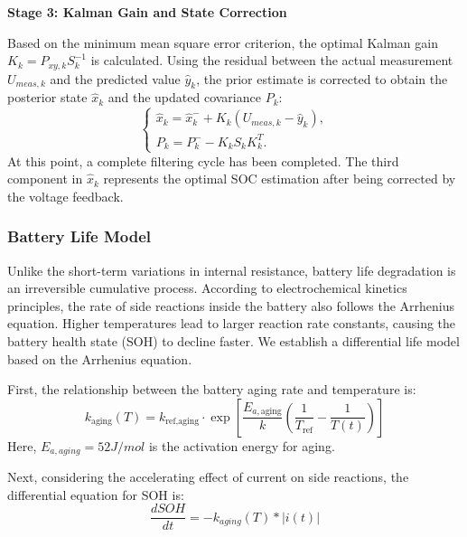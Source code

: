 \documentclass{mcmthesis}
\begin{document}
\textbf{Stage 3: Kalman Gain and State Correction}

Based on the minimum mean square error criterion, the optimal Kalman gain $K_k=P_{xy,k}S_k^{-1}$ is calculated. Using the residual between the actual measurement $U_{meas,k}$ and the predicted value $\hat{y}_k$, the prior estimate is corrected to obtain the posterior state $\hat{x}_k$ and the updated covariance $P_k$:
\begin{equation}
  \begin{cases}
    \hat{x}_k={\hat{x}}_k^-+K_k(U_{meas,k}-{\hat{y}}_k),\\
    P_k=P_k^--K_kS_kK_k^T.
  \end{cases}
\end{equation}
At this point, a complete filtering cycle has been completed. The third component in $\hat{x}_k$ represents the optimal SOC estimation after being corrected by the voltage feedback.
\subsubsection{Battery Life Model}
Unlike the short-term variations in internal resistance, battery life degradation is an irreversible cumulative process.
According to electrochemical kinetics principles, the rate of side reactions inside the battery also follows the Arrhenius equation.
Higher temperatures lead to larger reaction rate constants, causing the battery health state (SOH) to decline faster.
We establish a differential life model based on the Arrhenius equation.

First, the relationship between the battery aging rate and temperature is:
\begin{equation}
  k_{\text{aging}}(T) = k_{\text{ref,aging}} \cdot \exp\left[\frac{E_{a,\text{aging}}}{k}\left(\frac{1}{T_{\text{ref}}} - \frac{1}{T(t)}\right)\right]
\label{eq:aging}
\end{equation}
Here, $E_{a,aging}=52J/mol$\cite{Ecker2014CalendarCycleLife} is the activation energy for aging.

Next, considering the accelerating effect of current on side reactions, the differential equation for SOH is:
\begin{equation}
  \frac{dSOH}{dt}=-k_{aging}(T)\ast|i(t)|
\end{equation}
\end{document}
